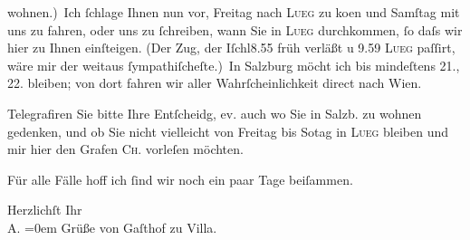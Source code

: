                wohnen.) Ich{ }ſchlage Ihnen nun vor, Freitag nach \textsc{Lueg} zu ko{\geminationm}en und Samſtag mit uns zu
               fahren, oder uns zu{ }ſchreiben, wann Sie in \textsc{Lueg} durchkommen,{ }ſo daſs wir hier zu Ihnen einſteigen. (Der Zug, der Iſchl8.55 früh verläßt u 9.59{ }\textsc{Lueg} paſſirt, wäre mir der weitaus{ }ſympathiſcheſte.) In Salzburg möcht ich bis mindeſtens 21.,
                  22. bleiben; von dort fahren wir aller Wahrſcheinlichkeit direct nach
                  Wien.\pend
           
\pstart
           Telegrafiren Sie bitte Ihre Entſcheidg, ev. auch wo Sie in Salzb. zu {\pb}wohnen gedenken, und
               ob Sie nicht vielleicht von Freitag bis So{\geminationn}tag in \textsc{Lueg} bleiben und mir hier den Grafen \textsc{Ch}. vorleſen möchten.\pend
           
\pstart
           Für alle Fälle hoff ich{ }ſind wir noch ein paar Tage beiſammen.\pend
           
\pstart
           Herzlichſt Ihr{\\[\baselineskip]}\spacefill\mbox{A.}\pend
           \leftskip=0em{}
\pstart
           \noindent{}Grüße von Gaſthof zu Villa.\pend
           \endnumbering{}  \newcommand{\dateiname}{L01444}\newcommand{\titel}{Arthur Schnitzler an Richard Beer-Hofmann, 14. 9. 1904}\newcommand{\editorInnen}{Martin Anton Müller und Gerd-Hermann Susen}
